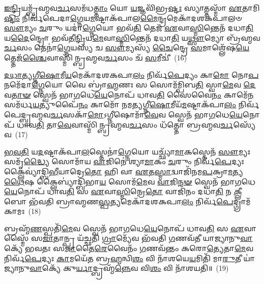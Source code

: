 \-\ul{𑌇}\-\-\ul{𑌨𑍍𑌦𑍍𑌰𑌿}\-𑌯𑌮𑍍𑌬𑍍𑌰᳴𑌹𑍍𑌮𑌵\-\ul{𑌰𑍍𑌚}\-𑌸𑌮᳴𑌧\-\ul{𑌤𑍍𑌤𑌾𑌂} 𑌯𑍋 \ul{𑌯}\-𑌜𑍍𑌞𑌵𑌿᳴𑌭𑍍𑌰\-\ul{𑌷𑍍𑌟𑌃} 𑌸𑍍𑌯𑌾𑌤𑍍𑌤𑌸𑍍𑌮𑌾᳴ \ul{𑌏}\-𑌤𑌾𑌮𑌿\-\ul{𑌷𑍍𑌟𑌿𑌂} 𑌨𑌿𑌰𑍍𑌵᳴𑌪𑍇𑌦𑌾\-\ul{𑌗𑍍𑌨𑍇}\-𑌯\-\ul{𑌮}\-𑌷𑍍𑌟𑌾𑌕᳴𑌪𑌾𑌲\-\ul{𑌮𑍈}\-𑌨𑍍𑌦𑍍𑌰𑌮𑍇𑌕𑌾᳴\-𑌦𑌶\-𑌕𑌪𑌾𑌲𑍞 \ul{𑌸𑍗}\-𑌮𑍍𑌯𑌂 \ul{𑌚}\-𑌰𑍁𑌂 𑌯𑌦𑌾॑\-\ul{𑌗𑍍𑌨𑍇}\-𑌯𑍋 𑌭𑌵᳴\-\ul{𑌤𑌿} 𑌤𑍇𑌜᳴ \ul{𑌏}\-𑌵𑌾\-\ul{𑌸𑍍𑌮𑌿}\-𑌨𑍍𑌤𑍇𑌨᳴ 𑌦𑌧𑌾\-\ul{𑌤𑌿} 𑌯\-\ul{𑌦𑍈}\-𑌨𑍍𑌦𑍍𑌰𑍋 𑌭𑌵᳴𑌤𑍀\-\ul{𑌨𑍍𑌦𑍍𑌰𑌿}\-𑌯\-\ul{𑌮𑍇}\-𑌵𑌾\-\ul{𑌸𑍍𑌮𑌿}\-𑌨𑍍𑌤𑍇𑌨᳴ 𑌦𑌧𑌾\-\ul{𑌤𑌿} 𑌯\-\ul{𑌥𑍍𑌸𑍗}\-𑌮𑍍𑌯𑍋 𑌬𑍍𑌰᳴𑌹𑍍𑌮𑌵\-\ul{𑌰𑍍𑌚}\-𑌸𑌂 𑌤𑍇𑌨𑌾॑\-\ul{𑌗𑍍𑌨𑍇}\-𑌯𑌸𑍍𑌯᳴ 𑌚 \ul{𑌸𑍗}\-𑌮𑍍𑌯𑌸𑍍𑌯᳴ \ul{𑌚𑍈}\-𑌨𑍍𑌦𑍍𑌰𑍇 \ul{𑌸}\-𑌮𑌾𑌶𑍍𑌲𑍇᳴𑌷\-\ul{𑌯𑍇}\-𑌤𑍍𑌤𑍇𑌜᳴\-\ul{𑌶𑍍𑌚𑍈}\-𑌵𑌾𑌸𑍍𑌮𑌿᳴𑌨𑍍𑌬𑍍𑌰𑌹𑍍𑌮𑌵\-\ul{𑌰𑍍𑌚}\-𑌸𑌂 𑌚᳴ \ul{𑌸}\-𑌮𑍀𑌚𑍀॑~(16)

\-\ul{𑌦}\-\-\ul{𑌧𑌾}\-\-\ul{𑌤𑍍𑌯}\-\-\ul{𑌗𑍍𑌨𑍀}\-\-\ul{𑌷𑍋}\-𑌮𑍀\-\ul{𑌯}\-𑌮𑍇𑌕𑌾᳴\-𑌦𑌶\-𑌕𑌪𑌾\-\ul{𑌲𑌂} 𑌨𑌿𑌰𑍍𑌵᳴\-\ul{𑌪𑍇}\-𑌦𑍍𑌯𑌂 𑌕𑌾\-\ul{𑌮𑍋} 𑌨𑍋\-\ul{𑌪}\-𑌨𑌮𑍇᳴𑌦𑌾\-\ul{𑌗𑍍𑌨𑍇}\-𑌯𑍋 𑌵𑍈 𑌬𑍍𑌰𑌾॑\-\ul{𑌹𑍍𑌮}\-𑌣𑌃 𑌸 𑌸𑍋𑌮᳴𑌮𑍍𑌪𑌿𑌬\-\ul{𑌤𑌿} 𑌸𑍍𑌵𑌾\-\ul{𑌮𑍇}\-𑌵 \ul{𑌦𑍇}\-𑌵\-\ul{𑌤𑌾}\-\-\ul{𑍟} 𑌸𑍍𑌵𑍇𑌨᳴ 𑌭𑌾\-\ul{𑌗}\-𑌧𑍇\-\ul{𑌯𑍇}\-𑌨𑍋𑌪᳴ 𑌧𑌾𑌵\-\ul{𑌤𑌿} 𑌸𑍈𑌵𑍈\-\ul{𑌨𑌂} 𑌕𑌾𑌮𑍇᳴\-\ul{𑌨} 𑌸𑌮᳴𑌰𑍍𑌧\-\ul{𑌯}\-𑌤𑍍𑌯𑍁𑌪𑍈᳴\-\ul{𑌨𑌂} 𑌕𑌾𑌮𑍋᳴ 𑌨𑌮𑌤𑍍𑌯𑌗𑍍𑌨𑍀\-\ul{𑌷𑍋}\-𑌮𑍀𑌯᳴\-\ul{𑌮}\-𑌷𑍍𑌟𑌾\-𑌕᳴𑌪𑌾\-\ul{𑌲𑌂} 𑌨𑌿𑌰𑍍𑌵᳴𑌪𑍇𑌦𑍍𑌬𑍍𑌰𑌹𑍍𑌮𑌵\-\ul{𑌰𑍍𑌚}\-𑌸𑌕𑌾᳴\-\ul{𑌮𑍋}\-\-𑌽𑌗𑍍𑌨𑍀𑌷𑍋𑌮𑌾᳴\-\ul{𑌵𑍇}\-𑌵 𑌸𑍍𑌵𑍇𑌨᳴ 𑌭𑌾\-\ul{𑌗}\-𑌧𑍇\-\ul{𑌯𑍇}\-𑌨𑍋𑌪᳴ 𑌧𑌾𑌵\-\ul{𑌤𑌿} 𑌤𑌾\-\ul{𑌵𑍇}\-𑌵𑌾𑌸𑍍𑌮𑌿᳴𑌨𑍍𑌬𑍍𑌰𑌹𑍍𑌮𑌵\-\ul{𑌰𑍍𑌚}\-𑌸𑌂 𑌧᳴𑌤𑍍𑌤𑍋 𑌬𑍍𑌰𑌹𑍍𑌮𑌵\-\ul{𑌰𑍍𑌚}\-𑌸𑍍𑌯𑍇᳴𑌵~(17)

\-\ul{𑌭}\-\-\ul{𑌵}\-\-\ul{𑌤𑌿} 𑌯\-\ul{𑌦}\-𑌷𑍍𑌟𑌾𑌕᳴𑌪𑌾\-\ul{𑌲}\-𑌸𑍍𑌤𑍇𑌨𑌾॑\-\ul{𑌗𑍍𑌨𑍇}\-𑌯𑍋 𑌯𑌚𑍍𑌛𑍍𑌯𑌾᳴\-\ul{𑌮𑌾}\-𑌕𑌸𑍍𑌤𑍇𑌨᳴ \ul{𑌸𑍗}\-𑌮𑍍𑌯𑌃 𑌸𑌮𑍃᳴\-\ul{𑌦𑍍𑌧𑍍𑌯𑍈} 𑌸𑍋𑌮𑌾᳴𑌯 \ul{𑌵𑌾}\-𑌜𑌿𑌨𑍇॑ 𑌶𑍍𑌯𑌾\-\ul{𑌮𑌾}\-𑌕𑌂 \ul{𑌚}\-𑌰𑍁𑌂 𑌨𑌿𑌰𑍍𑌵᳴\-\ul{𑌪𑍇}\-𑌦𑍍𑌯𑌃 𑌕𑍍𑌲𑍈𑌵𑍍𑌯𑌾॑𑌦𑍍𑌬𑌿\-\ul{𑌭𑍀}\-𑌯𑌾𑌦𑍍𑌰𑍇\-\ul{𑌤𑍋} 𑌹𑌿 𑌵𑌾 \ul{𑌏}\-𑌤\-\ul{𑌸𑍍𑌮𑌾}\-𑌦𑍍𑌵𑌾𑌜𑌿᳴𑌨𑌮\-\ul{𑌪}\-𑌕𑍍𑌰𑌾\-\ul{𑌮}\-𑌤𑍍𑌯\-\ul{𑌥𑍈}\-𑌷 𑌕𑍍𑌲𑍈𑌬𑍍𑌯𑌾॑𑌦𑍍𑌬𑌿𑌭𑌾\-\ul{𑌯} 𑌸𑍋𑌮᳴\-\ul{𑌮𑍇}\-𑌵 \ul{𑌵𑌾}\-𑌜𑌿\-\ul{𑌨}\-\-\ul{𑍟} 𑌸𑍍𑌵𑍇𑌨᳴ 𑌭𑌾\-\ul{𑌗}\-𑌧𑍇\-\ul{𑌯𑍇}\-𑌨𑍋𑌪᳴ 𑌧𑌾𑌵\-\ul{𑌤𑌿} 𑌸 \ul{𑌏}\-𑌵𑌾\-\ul{𑌸𑍍𑌮𑌿}\-𑌨𑍍𑌰𑍇\-\ul{𑌤𑍋} 𑌵𑌾𑌜𑌿᳴𑌨𑌂 𑌦𑌧𑌾\-\ul{𑌤𑌿} 𑌨 \ul{𑌕𑍍𑌲𑍀}\-𑌬𑍋 𑌭᳴𑌵𑌤𑌿 𑌬𑍍𑌰𑌾𑌹𑍍𑌮𑌣\-\ul{𑌸𑍍𑌪}\-𑌤𑍍𑌯𑌮𑍇𑌕𑌾᳴\-𑌦𑌶\-𑌕𑌪𑌾\-\ul{𑌲𑌂} 𑌨𑌿𑌰𑍍𑌵᳴\-\ul{𑌪𑍇}\-𑌦𑍍𑌗𑍍𑌰𑌾𑌮᳴𑌕𑌾𑌮𑌃~(18)

𑌬𑍍𑌰𑌹𑍍𑌮᳴\-\ul{𑌣}\-𑌸𑍍𑌪𑌤𑌿᳴\-\ul{𑌮𑍇}\-𑌵 𑌸𑍍𑌵𑍇𑌨᳴ 𑌭𑌾\-\ul{𑌗}\-𑌧𑍇\-\ul{𑌯𑍇}\-𑌨𑍋𑌪᳴ 𑌧𑌾𑌵\-\ul{𑌤𑌿} 𑌸 \ul{𑌏}\-𑌵𑌾𑌸𑍍𑌮𑍈᳴ 𑌸\-\ul{𑌜𑌾}\-𑌤𑌾𑌨𑍍𑌪𑍍𑌰 𑌯᳴𑌚𑍍𑌛𑌤𑌿 \ul{𑌗𑍍𑌰𑌾}\-𑌮𑍍𑌯𑍇᳴𑌵 𑌭᳴𑌵𑌤𑌿 \ul{𑌗}\-𑌣𑌵᳴𑌤𑍀 𑌯𑌾𑌜𑍍𑌯𑌾𑌨𑍁\-\ul{𑌵𑌾}\-𑌕𑍍𑌯𑍇᳴ 𑌭𑌵𑌤𑌃 𑌸\-\ul{𑌜𑌾}\-𑌤𑍈\-\ul{𑌰𑍇}\-𑌵𑍈𑌨𑌂᳴ \ul{𑌗}\-𑌣𑌵᳴𑌨𑍍𑌤𑌂 𑌕𑌰𑍋\-\ul{𑌤𑍍𑌯𑍇}\-𑌤𑌾\-\ul{𑌮𑍇}\-𑌵 𑌨𑌿𑌰𑍍𑌵᳴\-\ul{𑌪𑍇}\-𑌦𑍍𑌯𑌃 \ul{𑌕𑌾}\-𑌮𑌯𑍇᳴\-\ul{𑌤} 𑌬𑍍𑌰\-\ul{𑌹𑍍𑌮}\-𑌨𑍍𑌵𑌿\-\ul{𑌶𑌂} 𑌵𑌿 𑌨𑌾᳴𑌶𑌯𑍇\-\ul{𑌯}\-𑌮𑌿𑌤𑌿᳴ 𑌮𑌾\-\ul{𑌰𑍁}\-𑌤𑍀 𑌯𑌾॑𑌜𑍍𑌯𑌾𑌨𑍁\-\ul{𑌵𑌾}\-𑌕𑍍𑌯𑍇᳴ 𑌕𑍁\-\ul{𑌰𑍍𑌯𑌾}\-𑌦𑍍𑌬𑍍𑌰𑌹𑍍𑌮᳴\-\ul{𑌨𑍍𑌨𑍇}\-𑌵 𑌵𑌿\-\ul{𑌶𑌂} 𑌵𑌿 𑌨𑌾᳴𑌶𑌯𑌤𑌿॥~(19)

{\anuvakamend[{𑌤𑍇𑌜𑌃᳴ \ul{𑌸}\-𑌮𑍀𑌚𑍀॑ 𑌬𑍍𑌰𑌹𑍍𑌮𑌵\-\ul{𑌰𑍍𑌚}\-𑌸𑍍𑌯𑍇᳴𑌵 𑌗𑍍𑌰𑌾𑌮᳴𑌕𑌾\-\ul{𑌮}\-𑌸𑍍𑌤𑍍𑌰𑌿𑌚᳴𑌤𑍍𑌵𑌾𑌰𑌿𑍞𑌶𑌚𑍍𑌚}]}%

